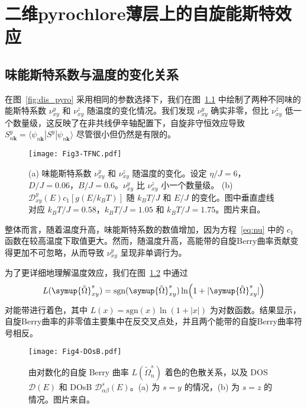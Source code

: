 \chapter{二维pyrochlore薄层上的自旋能斯特效应}
\label{chap:Spin_Nernst_Effect}
    \section{味能斯特系数与温度的变化关系}
        在图~\ref{fig:dis_pyro} 采用相同的参数选择下，我们在图~\ref{fig:coe_with_T} 中绘制了两种不同味的能斯特系数 $\nu^y_{xy}$ 和 $\nu^z_{xy}$ 随温度的变化情况。我们发现 $\nu^y_{xy}$ 确实非零，但比 $\nu^z_{xy}$ 低一个数量级，这反映了在非共线伊辛轴配置下，自旋非守恒效应导致 $S^y_{n{\bm{k}}}=\langle\psi_{n{\bm{k}}}|S^y|\psi_{n{\bm{k}}}\rangle$ 尽管很小但仍然是有限的。
        \begin{figure}[h]
            \centering
            \texttt{[image: Fig3-TFNC.pdf]}
            \caption{(a) 味能斯特系数 $\nu^y_{xy}$ 和 $\nu^z_{xy}$ 随温度的变化。设定 $\eta/J=6$，$D/J=0.06$，$B/J=0.6$。$\nu^y_{xy}$ 比 $\nu^z_{xy}$ 小一个数量级。 (b) $\mathcal{D}^y_{xy}(E) c_1[g(E/k_B T)]$ 随 $k_B T/J$ 和 $E/J$ 的变化。图中垂直虚线对应 $k_B T/J=0.58$，$k_B T/J=1.05$ 和 $k_B T/J=1.75$。图片来自\cite{lu2024Spin}。}
            \label{fig:coe_with_T}
        \end{figure}
    
        整体而言，随着温度升高，味能斯特系数的数值增加，因为方程~\eqref{eq:nu} 中的 $c_1$ 函数在较高温度下取值更大。然而，随温度升高，高能带的自旋Berry曲率贡献变得更加不可忽略，从而导致 $\nu^y_{xy}$ 呈现非单调行为。
        
        为了更详细地理解温度效应，我们在图~\ref{fig:colored dispersion and DOsB} 中通过
        \begin{equation}
            L(\symup{\tilde{\Omega}}^s_{xy})=\text{sgn}(\symup{\tilde{\Omega}}^s_{xy})\ln(1+|\symup{\tilde{\Omega}}^s_{xy}|)
        \end{equation}
        对能带进行着色，其中 $L(x)=\text{sgn}(x)\ln{(1+|x|)}$ 为对数函数。结果显示，自旋Berry曲率的非零值主要集中在反交叉点处，并且两个能带的自旋Berry曲率符号相反。

        \begin{figure}[b]
            \centering
            \texttt{[image: Fig4-DOsB.pdf]}
            \caption{由对数化的自旋 Berry 曲率 $L(\tilde{\Omega}^s_n)$ 着色的色散关系，以及 DOS $\mathcal{D}(E)$ 和 DOsB $\mathcal{D}^s_{\alpha \beta}(E)$。(a) 为 $s=y$ 的情况，(b) 为 $s=z$ 的情况。图片来自\cite{lu2024Spin}。}
            \label{fig:colored dispersion and DOsB}
        \end{figure}
        
